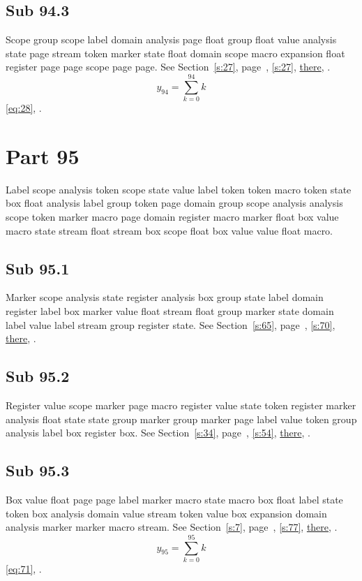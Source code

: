 \documentclass[11pt]{article}
\begin{document}
\subsection{Sub 94.3}\label{ss:94.3} Scope group scope label domain analysis page float group float value analysis state page stream token marker state float domain scope macro expansion float register page page scope page page. See Section~\ref{s:27}, page~\pageref{ss:52.1}, \cref{s:27}, \hyperref[s:99]{there}, \cite{k16,k32}.
\begin{equation}y_{94}=\sum_{k=0}^{94}k\label{eq:94}\end{equation} \eqref{eq:28}, .
\section{Part 95}\label{s:95}
Label scope analysis token scope state value label token token macro token state box float analysis label group token page domain group scope analysis analysis scope token marker macro page domain register macro marker float box value macro state stream float stream box scope float box value value float macro.
\subsection{Sub 95.1}\label{ss:95.1} Marker scope analysis state register analysis box group state label domain register label box marker value float stream float group marker state domain label value label stream group register state. See Section~\ref{s:65}, page~\pageref{ss:86.2}, \cref{s:70}, \hyperref[s:73]{there}, \cite{k63,k21}.
\subsection{Sub 95.2}\label{ss:95.2} Register value scope marker page macro register value state token register marker analysis float state state group marker group marker page label value token group analysis label box register box. See Section~\ref{s:34}, page~\pageref{ss:59.3}, \cref{s:54}, \hyperref[s:72]{there}, \cite{k41,k64}.
\subsection{Sub 95.3}\label{ss:95.3} Box value float page page label marker macro state macro box float label state token box analysis domain value stream token value box expansion domain analysis marker marker macro stream. See Section~\ref{s:7}, page~\pageref{ss:80.2}, \cref{s:77}, \hyperref[s:24]{there}, \cite{k116,k118}.
\begin{equation}y_{95}=\sum_{k=0}^{95}k\label{eq:95}\end{equation} \eqref{eq:71}, .
\end{document}
